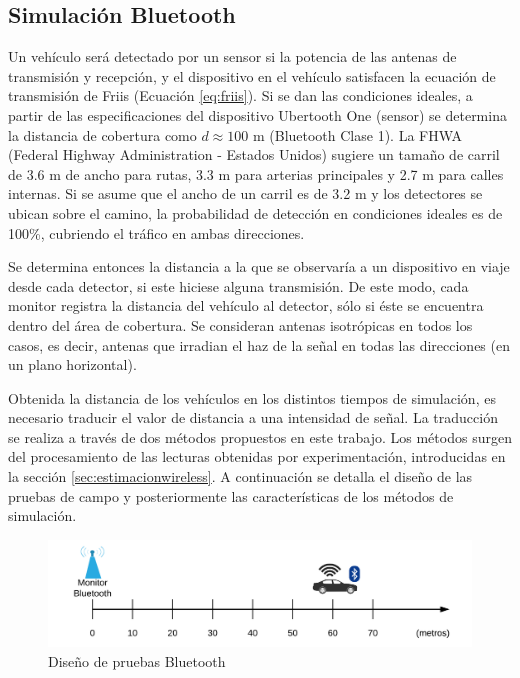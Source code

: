 \subsection{Simulación Bluetooth} \label{ssec:bt-simulation}
Un vehículo será detectado por un sensor si la potencia de las antenas de transmisión y recepción, y el dispositivo en el vehículo satisfacen la ecuación de transmisión de Friis (Ecuación \ref{eq:friis}). Si se dan las condiciones ideales, a partir de las especificaciones del dispositivo Ubertooth One (sensor) se determina la distancia de cobertura como $d \approx 100$ m (Bluetooth Clase 1). La FHWA (Federal Highway Administration - Estados Unidos) sugiere un tamaño de carril de 3.6 m de ancho para rutas, 3.3 m para arterias principales y 2.7 m para calles internas. Si se asume que el ancho de un carril es de 3.2 m y los detectores se ubican sobre el camino, la probabilidad de detección en condiciones ideales es de 100\%, cubriendo el tráfico en ambas direcciones.

Se determina entonces la distancia a la que se observaría a un dispositivo en viaje desde cada detector, si este hiciese alguna transmisión. De este modo, cada monitor registra la distancia del vehículo al detector, sólo si éste se encuentra dentro del área de cobertura. Se consideran antenas isotrópicas en todos los casos, es decir, antenas que irradian el haz de la señal en todas las direcciones (en un plano horizontal).

Obtenida la distancia de los vehículos en los distintos tiempos de simulación, es necesario traducir el valor de distancia a una intensidad de señal. La traducción se realiza a través de dos métodos propuestos en este trabajo. Los métodos surgen del procesamiento de las lecturas obtenidas por experimentación, introducidas en la sección \ref{sec:estimacionwireless}. A continuación se detalla el diseño de las pruebas de campo y posteriormente las características de los métodos de simulación.

\begin{figure}[!htp]
	\centering
	\includegraphics[width=\textwidth]{images/bt-experiment.png}
	\caption{Diseño de pruebas Bluetooth}
    \label{fig:opdf-experiment}
\end{figure}

